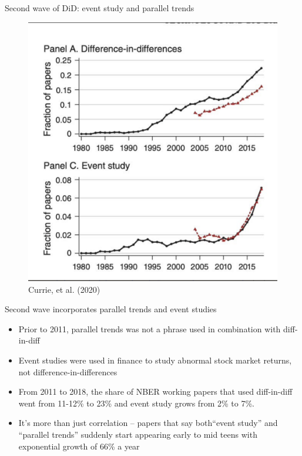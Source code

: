 \documentclass{beamer}
\begin{document}
\begin{frame}{Second wave of DiD: event study and parallel trends}

	\begin{figure}
	\caption{Currie, et al. (2020)}
	\includegraphics[scale=0.25]{./lecture_includes/secondwave.png}
	\end{figure}


\end{frame}

\begin{frame}{Second wave incorporates parallel trends and event studies}

\begin{itemize}

\item Prior to 2011, parallel trends was not a phrase used in combination with diff-in-diff
\item Event studies were used in finance to study abnormal stock market returns, not difference-in-differences
\item From 2011 to 2018, the share of NBER working papers that used diff-in-diff went from 11-12\% to 23\% and event study grows from 2\% to 7\%. 
\item It's more than just correlation -- papers that say  both``event study'' and ``parallel trends'' suddenly start appearing early to mid teens with exponential growth of 66\% a year
\end{itemize}

\end{frame}
\end{document}
